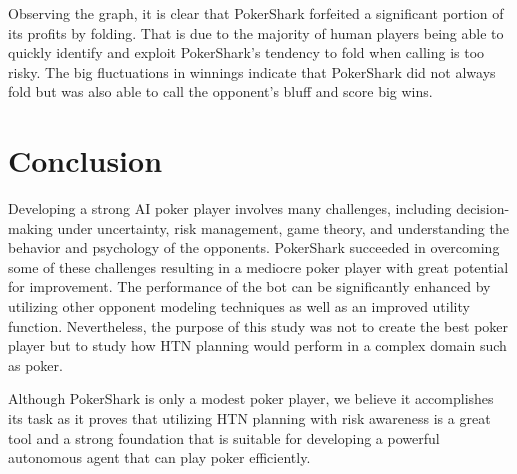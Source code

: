 Observing the graph, it is clear that PokerShark forfeited a significant portion of its profits by folding. That is due to the majority of human players being able to quickly identify and exploit PokerShark's tendency to fold when calling is too risky. The big fluctuations in winnings indicate that PokerShark did not always fold but was also able to call the opponent's bluff and score big wins.


\section*{Conclusion}
Developing a strong AI poker player involves many challenges, including decision-making under uncertainty, risk management, game theory, and understanding the behavior and psychology of the opponents. PokerShark succeeded in overcoming some of these challenges resulting in a mediocre poker player with great potential for improvement. The performance of the bot can be significantly enhanced by utilizing other opponent modeling techniques as well as an improved utility function. Nevertheless, the purpose of this study was not to create the best poker player but to study how HTN planning would perform in a complex domain such as poker.

Although PokerShark is only a modest poker player, we believe it accomplishes its task as it proves that utilizing HTN planning with risk awareness is a great tool and a strong foundation that is suitable for developing a powerful autonomous agent that can play poker efficiently.


